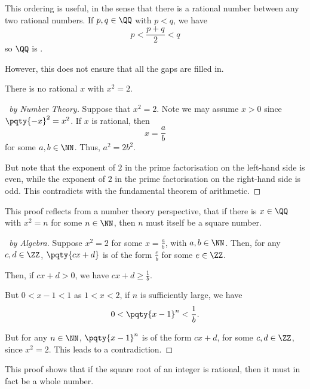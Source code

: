 This ordering is useful, in the sense that there is a rational number between any two rational numbers. If \(p, q \in \QQ\) with \(p < q\), we have
\[
    p < \frac{p + q}{2} < q
\]
so \(\QQ\) is .

However, this does not ensure that all the gaps are filled in.

\begin{proposition}
    There is no rational \(x\) with \(x^2 = 2\).    
\end{proposition}

\begin{proof}[\proofname\ by Number Theory]
    Suppose that \(x^2 = 2\). Note we may assume \(x > 0\) since \(\pqty{-x}^2 = x^2\). If \(x\) is rational, then
    \[
        x = \frac{a}{b}
    \]
    for some \(a, b \in \NN\). Thus, \(a^2 = 2b^2\).

    But note that the exponent of \(2\) in the prime factorisation on the left-hand side is even, while the exponent of \(2\) in the prime factorisation on the right-hand side is odd. This contradicts with the fundamental theorem of arithmetic.
\end{proof}

\begin{remark}
    This proof reflects from a number theory perspective, that if there is \(x \in \QQ\) with \(x^2 = n\) for some \(n \in \NN\), then \(n\) must itself be a square number.
\end{remark}

\begin{proof}[\proofname\ by Algebra]
    Suppose \(x^2 = 2\) for some \(x = \frac{a}{b}\), with \(a, b \in \NN\). Then, for any \(c, d \in \ZZ\), \(\pqty{cx + d}\) is of the form \(\frac{e}{b}\) for some \(e \in \ZZ\).

    Then, if \(cx + d > 0\), we have \(cx + d \geq \frac{1}{b}\).

    But \(0 < x - 1 < 1\) as \(1 < x < 2\), if \(n\) is sufficiently large, we have
    \[
        0 < \pqty{x - 1}^n < \frac{1}{b}.
    \]

    But for any \(n \in \NN\), \(\pqty{x - 1}^n\) is of the form \(cx + d\), for some \(c, d \in \ZZ\), since \(x^2 = 2\). This leads to a contradiction.
\end{proof}

\begin{remark}
    This proof shows that if the square root of an integer is rational, then it must in fact be a whole number.
\end{remark}

